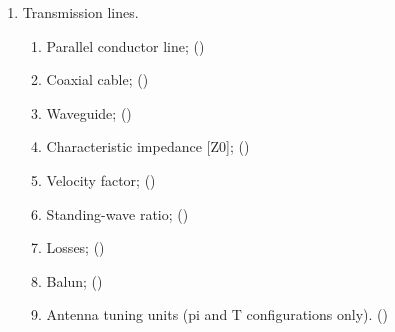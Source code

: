 \begin{flushleft}
\begin{enumerate}
\begin{enumerate}
\item Transmission lines.
\begin{enumerate}
\item Parallel conductor line; ()\label{HAREC.a.6.3.1}
\item Coaxial cable; ()\label{HAREC.a.6.3.2}
\item Waveguide; ()\label{HAREC.a.6.3.3}
\item Characteristic impedance [Z0];
  ()\label{HAREC.a.6.3.4}
\item Velocity factor; ()\label{HAREC.a.6.3.5}
\item Standing-wave ratio; ()\label{HAREC.a.6.3.6}
\item Losses; ()\label{HAREC.a.6.3.7}
\item Balun; ()\label{HAREC.a.6.3.8}
\item Antenna tuning units (pi and T configurations only).
  ()\label{HAREC.a.6.3.9}
\end{enumerate}
\end{enumerate}


\end{enumerate}
\end{flushleft}
